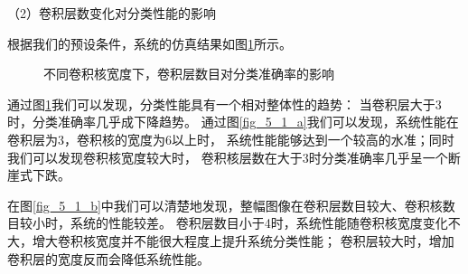 （2）卷积层数变化对分类性能的影响\par

根据我们的预设条件，系统的仿真结果如图\ref{fig_5_1}所示。\par
\begin{figure}[!h]
	\centering
	\caption{不同卷积核宽度下，卷积层数目对分类准确率的影响}
	\label{fig_5_1}
\end{figure}

通过图\ref{fig_5_1}我们可以发现，分类性能具有一个相对整体性的趋势：
当卷积层大于3时，分类准确率几乎成下降趋势。
通过图\ref{fig_5_1_a}我们可以发现，系统性能在卷积层为$3$，卷积核的宽度为$6$以上时，
系统性能能够达到一个较高的水准；同时我们可以发现卷积核宽度较大时，
卷积核层数在大于$3$时分类准确率几乎呈一个断崖式下跌。\par

在图\ref{fig_5_1_b}中我们可以清楚地发现，整幅图像在卷积层数目较大、卷积核数目较小时，系统的性能较差。
卷积层数目小于4时，系统性能随卷积核宽度变化不大，增大卷积核宽度并不能很大程度上提升系统分类性能；
卷积层较大时，增加卷积层的宽度反而会降低系统性能。\par

